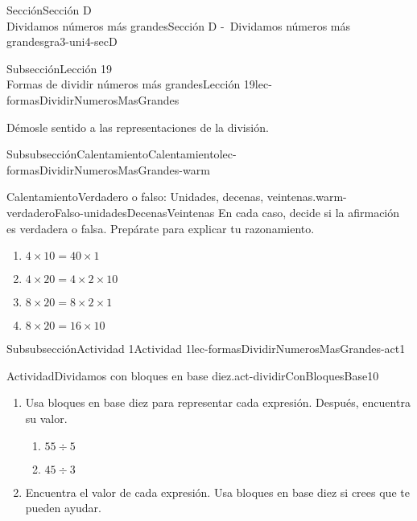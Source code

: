 \begin{sectionptx}{Sección}{{\Large Sección D\\}Dividamos números más grandes}{}{Sección D -~Dividamos números más grandes}{}{}{gra3-uni4-secD}
\begin{subsectionptx}{Subsección}{{\normalsize Lección 19\\[-0.05cm]}Formas de dividir números más grandes}{}{Lección 19}{}{}{lec-formasDividirNumerosMasGrandes}
\begin{introduction}{}%
Démosle sentido a las representaciones de la división.%
\end{introduction}%
%
%
\typeout{************************************************}
\typeout{************************************************}
%
\begin{subsubsectionptx}{Subsubsección}{Calentamiento}{}{Calentamiento}{}{}{lec-formasDividirNumerosMasGrandes-warm}
\begin{exploration}{Calentamiento}{Verdadero o falso: Unidades, decenas, veintenas.}{warm-verdaderoFalso-unidadesDecenasVeintenas}%
En cada caso, decide si la afirmación es verdadera o falsa. Prepárate para explicar tu razonamiento.%
%
\begin{enumerate}[label={\Alph*.}]
\item{}\(\displaystyle 4 \times 10 = 40 \times 1\)%
\item{}\(\displaystyle 4 \times 20 = 4 \times 2 \times 10\)%
\item{}\(\displaystyle 8 \times 20 = 8 \times 2 \times 1\)%
\item{}\(\displaystyle 8 \times 20 = 16 \times 10\)%
\end{enumerate}
\end{exploration}%
\end{subsubsectionptx}
%
%
\typeout{************************************************}
\typeout{************************************************}
%
\begin{subsubsectionptx}{Subsubsección}{Actividad 1}{}{Actividad 1}{}{}{lec-formasDividirNumerosMasGrandes-act1}
\begin{activity}{Actividad}{Dividamos con bloques en base diez.}{act-dividirConBloquesBase10}%
\begin{sidebyside}{2}{0}{0}{0.1}%
\begin{sbspanel}{0.7}%
%
\begin{enumerate}
\item{}Usa bloques en base diez para representar cada expresión. Después, encuentra su valor.%
%
\begin{enumerate}
\item{}\(\displaystyle 55 \div 5\)%
\item{}\(\displaystyle 45 \div 3\)%
\end{enumerate}
\item{}Encuentra el valor de cada expresión. Usa bloques en base diez si crees que te pueden ayudar.%

\end{enumerate}
\end{sbspanel}
\end{sidebyside}
\end{activity}
\end{subsubsectionptx}
\end{subsectionptx}
\end{sectionptx}
